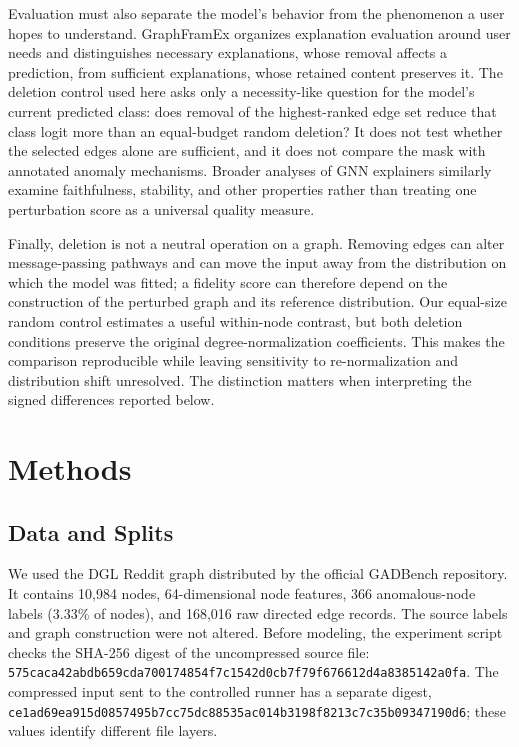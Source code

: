 \documentclass[11pt,a4paper]{article}
\begin{document}
Evaluation must also separate the model's behavior from the phenomenon a user hopes to understand. GraphFramEx organizes explanation evaluation around user needs and distinguishes necessary explanations, whose removal affects a prediction, from sufficient explanations, whose retained content preserves it\cite{amara2022graphframex}. The deletion control used here asks only a necessity-like question for the model's current predicted class: does removal of the highest-ranked edge set reduce that class logit more than an equal-budget random deletion? It does not test whether the selected edges alone are sufficient, and it does not compare the mask with annotated anomaly mechanisms. Broader analyses of GNN explainers similarly examine faithfulness, stability, and other properties rather than treating one perturbation score as a universal quality measure\cite{agarwal2022probing}.

Finally, deletion is not a neutral operation on a graph. Removing edges can alter message-passing pathways and can move the input away from the distribution on which the model was fitted; a fidelity score can therefore depend on the construction of the perturbed graph and its reference distribution\cite{zheng2024robust}. Our equal-size random control estimates a useful within-node contrast, but both deletion conditions preserve the original degree-normalization coefficients. This makes the comparison reproducible while leaving sensitivity to re-normalization and distribution shift unresolved. The distinction matters when interpreting the signed differences reported below.

\section{Methods}
\subsection{Data and Splits}
We used the DGL Reddit graph distributed by the official GADBench repository\cite{gadbenchrepo}. It contains 10,984 nodes, 64-dimensional node features, 366 anomalous-node labels (3.33\% of nodes), and 168,016 raw directed edge records. The source labels and graph construction were not altered. Before modeling, the experiment script checks the SHA-256 digest of the uncompressed source file: \texttt{\scriptsize 575caca4\allowbreak 2abdb659\allowbreak cda70017\allowbreak 4854f7c1\allowbreak 542d0cb7\allowbreak f79f6766\allowbreak 12d4a838\allowbreak 5142a0fa}. The compressed input sent to the controlled runner has a separate digest, \texttt{\scriptsize ce1ad69e\allowbreak a915d085\allowbreak 7495b7cc\allowbreak 75dc8853\allowbreak 5ac014b3\allowbreak 198f8213\allowbreak c7c35b09\allowbreak 347190d6}; these values identify different file layers.
\end{document}
